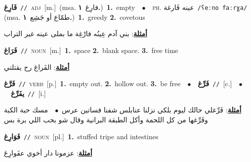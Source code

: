 \documentclass[10pt,a4paper,twoside]{article} %
\begin{document}
\begin{multicols}{2}
{\setlength\topsep{0pt}\textbf{\foreignlanguage{arabic}{فَارِغ}}\ {\color{gray}\texttt{//}\color{black}}\ \textsc{adj}\ [m.]\ \color{gray}(msa. \foreignlanguage{arabic}{فارِغ}~\foreignlanguage{arabic}{\textbf{١.}})\color{black}\ \textbf{1.}~empty\ \ $\bullet$\ \ \textsc{ph.} \color{gray} \foreignlanguage{arabic}{عينه فَارغة}\color{black}\ {\color{gray}\texttt{/{\sffamily ʕeːno faːrɣa}/}\color{black}}\ \color{gray} (msa. \foreignlanguage{arabic}{طمّاع أو جَشِع}~\foreignlanguage{arabic}{\textbf{١.}})\color{black}\ \textbf{1.}~greedy  \textbf{2.}~covetous\  \begin{flushright}\color{gray}\foreignlanguage{arabic}{\textbf{\underline{\foreignlanguage{arabic}{أمثلة}}}: بني آدم عِينُه فارْغِة ما بملى عينه غير التراب}\end{flushright}\color{black}} \vspace{2mm}

{\setlength\topsep{0pt}\textbf{\foreignlanguage{arabic}{فَرَاغ}}\ {\color{gray}\texttt{//}\color{black}}\ \textsc{noun}\ [m.]\ \textbf{1.}~space  \textbf{2.}~blank space.  \textbf{3.}~free time\  \begin{flushright}\color{gray}\foreignlanguage{arabic}{\textbf{\underline{\foreignlanguage{arabic}{أمثلة}}}: الفَراغ رح يقتلتي}\end{flushright}\color{black}} \vspace{2mm}

{\setlength\topsep{0pt}\textbf{\foreignlanguage{arabic}{فَرَّغ}}\ {\color{gray}\texttt{//}\color{black}}\ \textsc{verb}\ [p.]\ \textbf{1.}~empty out.  \textbf{2.}~hollow out.  \textbf{3.}~be free\ \ $\bullet$\ \ \setlength\topsep{0pt}\textbf{\foreignlanguage{arabic}{فَرِّغ}}\ {\color{gray}\texttt{//}\color{black}}\ [c.]\ \ $\bullet$\ \ \setlength\topsep{0pt}\textbf{\foreignlanguage{arabic}{يفَرِّغ}}\ {\color{gray}\texttt{//}\color{black}}\ [i.]\  \begin{flushright}\color{gray}\foreignlanguage{arabic}{\textbf{\underline{\foreignlanguage{arabic}{أمثلة}}}: فَرِّغلي حالك ليوم بلكي نزلنا عنابلس شفنا فساتين عرس\ $\bullet$\ \  مسك حبة الكبة وفَرِّغها من كل اللحمة وأكل الطبقة البرانية وقال شو بحب اللي برة بس}\end{flushright}\color{black}} \vspace{2mm}

{\setlength\topsep{0pt}\textbf{\foreignlanguage{arabic}{فَوَارِغ}}\ {\color{gray}\texttt{//}\color{black}}\ \textsc{noun}\ [pl.]\ \textbf{1.}~stuffed tripe and intestines\  \begin{flushright}\color{gray}\foreignlanguage{arabic}{\textbf{\underline{\foreignlanguage{arabic}{أمثلة}}}: عزمونا دار أخوي عفَوارِغ}\end{flushright}\color{black}} \vspace{2mm}


\end{multicols}
\end{document}
